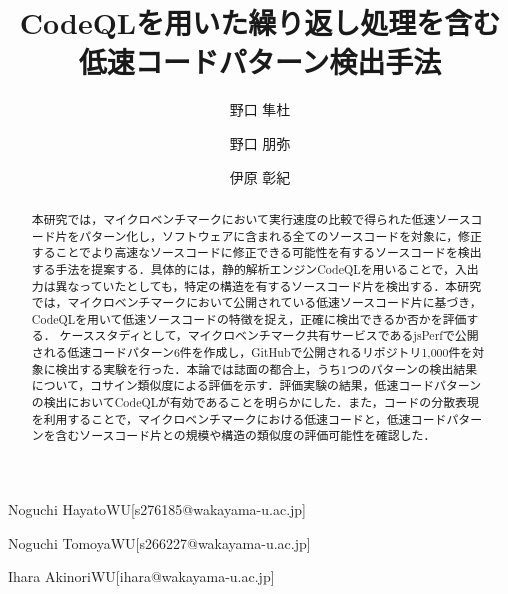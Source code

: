 \documentclass[submit,techrep,noauthor]{ipsj}
\newcommand{\todo}[1]{\colorbox{yellow}{{\bf TODO}:}{\color{red} {\textbf{[#1]}}}}
\begin{document}
\title{CodeQLを用いた繰り返し処理を含む
\\
低速コードパターン検出手法
}


\author{野口 隼杜}{Noguchi Hayato}{WU}[s276185@wakayama-u.ac.jp]
\author{野口 朋弥}{Noguchi Tomoya}{WU}[s266227@wakayama-u.ac.jp]
\author{伊原 彰紀}{Ihara Akinori}{WU}[ihara@wakayama-u.ac.jp]

\begin{abstract}
本研究では，マイクロベンチマークにおいて実行速度の比較で得られた低速ソースコード片をパターン化し，ソフトウェアに含まれる全てのソースコードを対象に，修正することでより高速なソースコードに修正できる可能性を有するソースコードを検出する手法を提案する．具体的には，静的解析エンジンCodeQLを用いることで，入出力は異なっていたとしても，特定の構造を有するソースコード片を検出する．本研究では，マイクロベンチマークにおいて公開されている低速ソースコード片に基づき，CodeQLを用いて低速ソースコードの特徴を捉え，正確に検出できるか否かを評価する．
ケーススタディとして，マイクロベンチマーク共有サービスであるjsPerfで公開される低速コードパターン6件を作成し，GitHubで公開されるリポジトリ1,000件を対象に検出する実験を行った．本論では誌面の都合上，うち1つのパターンの検出結果について，コサイン類似度による評価を示す．評価実験の結果，低速コードパターンの検出においてCodeQLが有効であることを明らかにした．また，コードの分散表現を利用することで，マイクロベンチマークにおける低速コードと，低速コードパターンを含むソースコード片との規模や構造の類似度の評価可能性を確認した．


\end{abstract}
\end{document}

